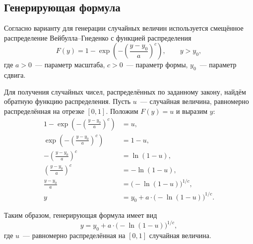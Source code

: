 \subsection*{Генерирующая формула}

Согласно варианту для генерации случайных величин используется
смещённое распределение Вейбулла--Гнеденко
с функцией распределения
\[
    F(y) = 1 - \exp\!\left(-\left(\frac{y - y_0}{a}\right)^{c}\right),
    \qquad y > y_0,
\]
где $a > 0$~--- параметр масштаба, $c > 0$~--- параметр формы,
$y_0$~--- параметр сдвига.

Для получения случайных чисел, распределённых по заданному закону, найдём обратную функцию распределения.
Пусть $u$~--- случайная величина,
равномерно распределённая на отрезке $[0, 1]$. Положим $F(y) = u$ и выразим $y$:
\begin{align*}
    1 - \exp\!\left(-\left(\frac{y - y_0}{a}\right)^{c}\right) &= u, \\
    \exp\!\left(-\left(\frac{y - y_0}{a}\right)^{c}\right) &= 1 - u, \\
    -\left(\frac{y - y_0}{a}\right)^{c} &= \ln(1 - u), \\
    \left(\frac{y - y_0}{a}\right)^{c} &= -\ln(1 - u), \\
    \frac{y - y_0}{a} &= \bigl(-\ln(1 - u)\bigr)^{1/c}, \\
    y &= y_0 + a \cdot \bigl(-\ln(1 - u)\bigr)^{1/c}.
\end{align*}

Таким образом, генерирующая формула имеет вид
\[
    \boxed{\,y = y_0 + a \cdot \bigl(-\ln(1 - u)\bigr)^{1/c},\,}
\]
где $u$~--- равномерно распределённая на $[0, 1]$ случайная величина.
